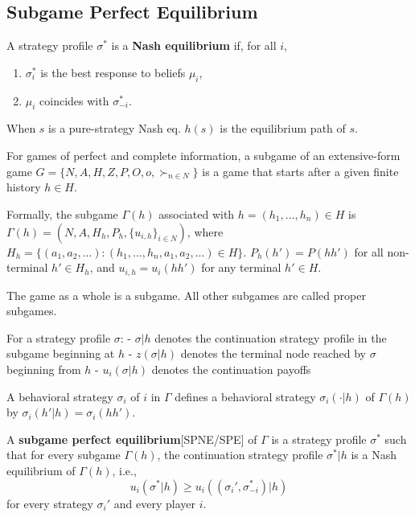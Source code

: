 \documentclass[11pt]{elegantbook_2}
\begin{document}
\subsection{Subgame Perfect Equilibrium}
\begin{definition}
    A strategy profile $\sigma^*$ is a \textbf{Nash equilibrium} if, for all $i$,
    \begin{enumerate}
        \item $\sigma_i^*$ is the best response to beliefs $\mu_i$,
        \item $\mu_i$ coincides with $\sigma_{-i}^*$.
    \end{enumerate}
\end{definition}
When $s$ is a pure-strategy Nash eq. $h(s)$ is the equilibrium path of $s$.

\begin{definition}
For games of perfect and complete information, a subgame of an extensive-form game $G=\{N,A,H,Z,P,O,o,\succ_{n\in N}\}$ is a game that starts after a given finite history $h \in H$.

Formally, the subgame $\Gamma(h)$ associated with $h=(h_1,...,h_n)\in H$ is $\Gamma(h)=\left(N,A,H_h,P_h,\{u_{i,h}\}_{i\in N}\right)$, where $H_h=\{(a_1,a_2,...):(h_1,...,h_n,a_1,a_2,...)\in H\}$. $P_h(h')=P(hh')$ for all non-terminal $h'\in H_h$, and $u_{i,h}=u_i(hh')$ for any terminal $h'\in H$.

The game as a whole is a subgame. All other subgames are called proper subgames.
\end{definition}

For a strategy profile $\sigma$:
- $\sigma|h$ denotes the continuation strategy profile in the subgame beginning at $h$
- $z(\sigma|h)$ denotes the terminal node reached by $\sigma$ beginning from $h$
- $u_i(\sigma|h)$ denotes the continuation payoffs

A behavioral strategy $\sigma_i$ of $i$ in $\Gamma$ defines a behavioral strategy $\sigma_i(\cdot|h)$ of $\Gamma(h)$ by $\sigma_i(h'|h)=\sigma_i(hh')$.

\begin{definition}
    A \textbf{subgame perfect equilibrium}[SPNE/SPE] of $\Gamma$ is a strategy profile $\sigma^*$ such that for every subgame $\Gamma(h)$, the continuation strategy profile $\sigma^*|h$ is a Nash equilibrium of $\Gamma(h)$, i.e.,
    $$u_i(\sigma^*|h) \geq u_i((\sigma_i',\sigma_{-i}^*)|h)$$
    for every strategy $\sigma_i'$ and every player $i$.
\end{definition}
\end{document}
